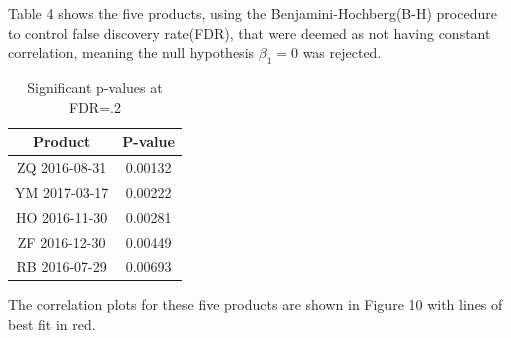 \documentclass[12pt]{article}
\begin{document}
Table 4 shows the five products, using the Benjamini-Hochberg(B-H) procedure to control false discovery rate(FDR), that were deemed as not having constant correlation, meaning the null hypothesis $\beta_1=0$ was rejected.
\begin{table}[H]
	\centering
	\caption{Significant p-values at FDR=.2}
	\label{Table 4}
	\begin{tabular}{|c|c|}
		\hline
		Product          & P-value \\ \hline
		ZQ 2016-08-31    & 0.00132        \\ \hline
		YM 2017-03-17    & 0.00222      \\ \hline
		HO 2016-11-30    & 0.00281      \\ \hline
		ZF 2016-12-30    & 0.00449      \\ \hline
		RB 2016-07-29    & 0.00693     \\ \hline
	\end{tabular}
\end{table}

The correlation plots for these five products are shown in Figure 10  with lines of best fit in red.
\end{document}
